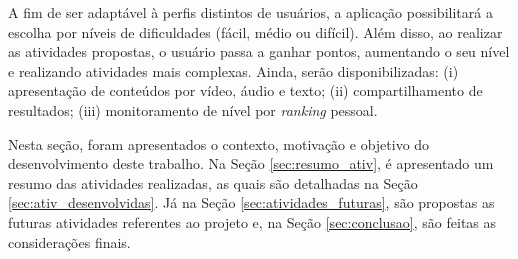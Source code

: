 A fim de ser adaptável à perfis distintos de usuários, a aplicação possibilitará a escolha por níveis de dificuldades (fácil, médio ou difícil). Além disso, ao realizar as atividades propostas, o usuário passa a ganhar pontos, aumentando o seu nível e realizando atividades mais complexas. Ainda, serão disponibilizadas: (i) apresentação de conteúdos por vídeo, áudio e texto; (ii) compartilhamento de resultados; (iii) monitoramento de nível por \textit{ranking} pessoal. 


Nesta seção, foram apresentados o contexto, motivação e objetivo do desenvolvimento deste trabalho. Na Seção \ref{sec:resumo_ativ}, é apresentado um resumo das atividades realizadas, as quais são detalhadas na Seção \ref{sec:ativ_desenvolvidas}. Já na Seção \ref{sec:atividades_futuras}, são propostas as futuras atividades referentes ao projeto e, na Seção \ref{sec:conclusao}, são feitas as considerações finais.